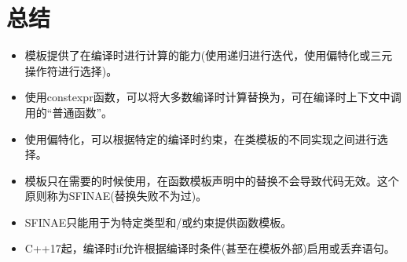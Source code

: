 \section{总结}

\begin{itemize}
\item 
模板提供了在编译时进行计算的能力(使用递归进行迭代，使用偏特化或三元操作符进行选择)。

\item 
使用constexpr函数，可以将大多数编译时计算替换为，可在编译时上下文中调用的“普通函数”。

\item 
使用偏特化，可以根据特定的编译时约束，在类模板的不同实现之间进行选择。

\item 
模板只在需要的时候使用，在函数模板声明中的替换不会导致代码无效。这个原则称为SFINAE(替换失败不为过)。

\item 
SFINAE只能用于为特定类型和/或约束提供函数模板。

\item 
C++17起，编译时if允许根据编译时条件(甚至在模板外部)启用或丢弃语句。
\end{itemize}